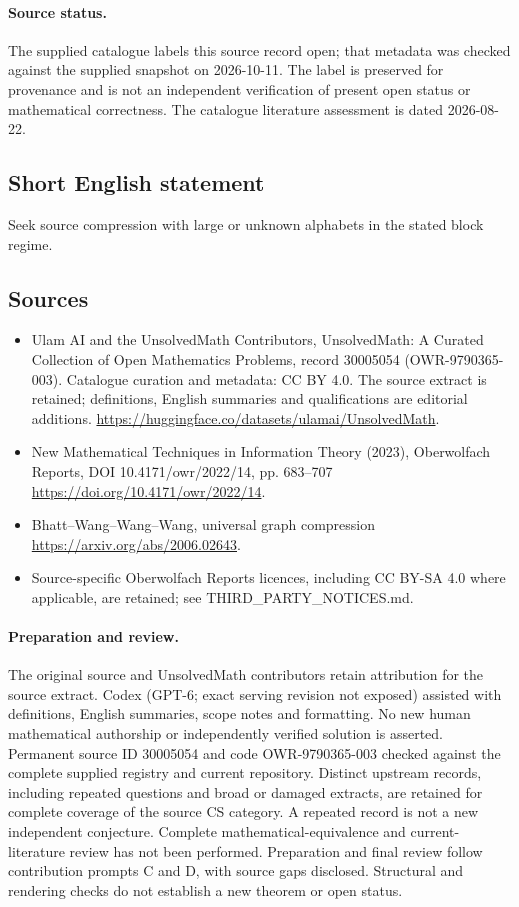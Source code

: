 \documentclass[11pt]{article}
\begin{document}
\paragraph{Source status.}
The supplied catalogue labels this source record open; that metadata was checked against the supplied snapshot on 2026-10-11. The label is preserved for provenance and is not an independent verification of present open status or mathematical correctness. The catalogue literature assessment is dated 2026-08-22.
\subsection{Short English statement}
Seek source compression with large or unknown alphabets in the stated block regime.
\subsection{Sources}
\begin{itemize}
\item[\hypertarget{source:30005054:1}{S1}] Ulam AI and the UnsolvedMath Contributors, UnsolvedMath: A Curated Collection of Open Mathematics Problems, record 30005054 (OWR-9790365-003). Catalogue curation and metadata: CC BY 4.0. The source extract is retained; definitions, English summaries and qualifications are editorial additions.
\url{https://huggingface.co/datasets/ulamai/UnsolvedMath}.
\item[\hypertarget{source:30005054:2}{S2}] New Mathematical Techniques in Information Theory (2023), Oberwolfach Reports, DOI 10.4171/owr/2022/14, pp. 683--707
\url{https://doi.org/10.4171/owr/2022/14}.
\item[\hypertarget{source:30005054:3}{S3}] Bhatt--Wang--Wang--Wang, universal graph compression
\url{https://arxiv.org/abs/2006.02643}.
\item Source-specific Oberwolfach Reports licences, including CC BY-SA 4.0 where applicable, are retained; see THIRD\_PARTY\_NOTICES.md.
\end{itemize}
\paragraph{Preparation and review.}
The original source and UnsolvedMath contributors retain attribution for the source extract. Codex (GPT-6; exact serving revision not exposed) assisted with definitions, English summaries, scope notes and formatting. No new human mathematical authorship or independently verified solution is asserted. Permanent source ID 30005054 and code OWR-9790365-003 checked against the complete supplied registry and current repository. Distinct upstream records, including repeated questions and broad or damaged extracts, are retained for complete coverage of the source CS category. A repeated record is not a new independent conjecture. Complete mathematical-equivalence and current-literature review has not been performed. Preparation and final review follow contribution prompts C and D, with source gaps disclosed. Structural and rendering checks do not establish a new theorem or open status.
\label{end:30005054}
\end{document}
